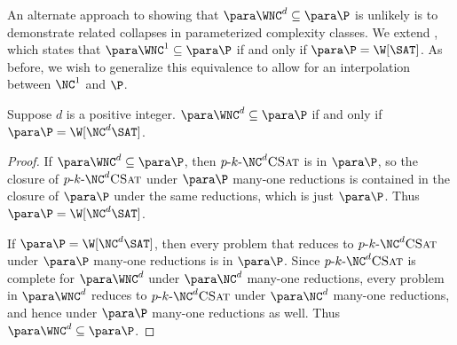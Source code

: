 An alternate approach to showing that $\para \WNC^d \subseteq \para \P$ is unlikely is to demonstrate related collapses in parameterized complexity classes.
We extend \autocite[Corollary~3.8]{est15}, which states that $\para \WNC^1 \subseteq \para \P$ if and only if $\para \P = \W[\SAT]$.
As before, we wish to generalize this equivalence to allow for an interpolation between $\NC^1$ and $\P$.

\begin{theorem}
  Suppose $d$ is a positive integer.
  $\para \WNC^d \subseteq \para \P$ if and only if $\para \P = \W[\NC^d \SAT]$.
\end{theorem}
\begin{proof}
  If $\para \WNC^d \subseteq \para \P$, then $\pNCSAT$ is in $\para \P$, so the closure of $\pNCSAT$ under $\para \P$ many-one reductions is contained in the closure of $\para \P$ under the same reductions, which is just $\para \P$.
  Thus $\para \P = \W[\NC^d \SAT]$.

  If $\para \P = \W[\NC^d \SAT]$, then every problem that reduces to $\pNCSAT$ under $\para \P$ many-one reductions is in $\para \P$.
  Since $\pNCSAT$ is complete for $\para \WNC^d$ under $\para \NC^d$ many-one reductions, every problem in $\para \WNC^d$ reduces to $\pNCSAT$ under $\para \NC^d$ many-one reductions, and hence under $\para \P$ many-one reductions as well.
  Thus $\para \WNC^d \subseteq \para \P$.
\end{proof}
